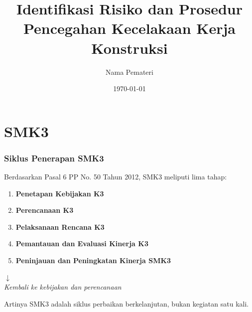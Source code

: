 \documentclass[../main.tex]{subfiles}
\title{Identifikasi Risiko dan Prosedur Pencegahan Kecelakaan Kerja Konstruksi}
\author{Nama Pemateri}
\date{\today}
\begin{document}
\section{SMK3}%
\label{sec:SMK3}

\begin{frame}[mytitle=standard,c,mycolor=digiPH_uniblue!15]
	\frametitle{Siklus Penerapan SMK3}

	Berdasarkan Pasal 6 PP No. 50 Tahun 2012, SMK3 meliputi lima tahap:

	\begin{enumerate}
		\item \textbf{Penetapan Kebijakan K3}
		\item \textbf{Perencanaan K3}
		\item \textbf{Pelaksanaan Rencana K3}
		\item \textbf{Pemantauan dan Evaluasi Kinerja K3}
		\item \textbf{Peninjauan dan Peningkatan Kinerja SMK3}
	\end{enumerate}

	\begin{center}
		$\downarrow$\\
		\textit{Kembali ke kebijakan dan perencanaan}
	\end{center}

	\begin{exampleblock}{Artinya}
		SMK3 adalah siklus perbaikan berkelanjutan, bukan kegiatan satu kali.
	\end{exampleblock}
\end{frame}
\end{document}
